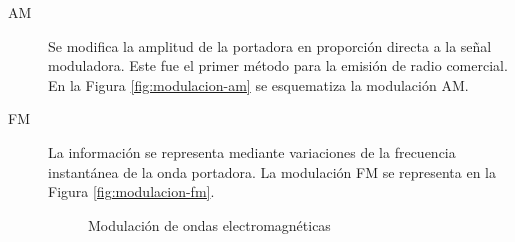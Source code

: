 \begin{description}

\item [AM] Se modifica la amplitud de la portadora en proporci\'on directa a la se\~nal moduladora. Este fue el primer m\'etodo para la emisi\'on de radio comercial. En la Figura \ref{fig:modulacion-am} se esquematiza la modulaci\'on AM.


\item [FM]La informaci\'on se representa mediante variaciones de la frecuencia instant\'anea de la onda portadora.
La modulaci\'on FM se representa en la Figura \ref{fig:modulacion-fm}.

  \begin{figure}[!h]
    \centering
{}
\caption{Modulaci\'on de ondas electromagn\'eticas}
  \end{figure}



\end{description}
